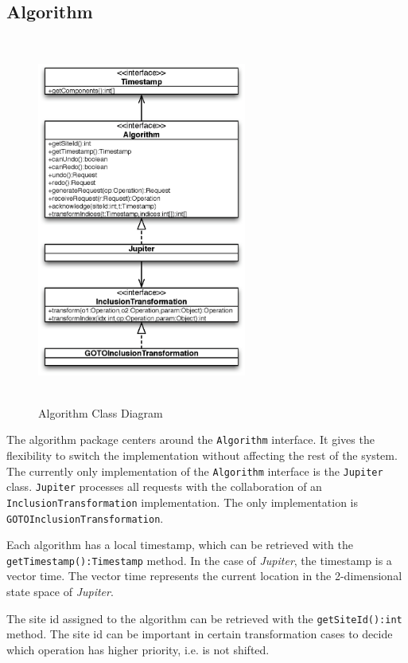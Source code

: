 \subsection{Algorithm}

\begin{figure}[H]
\centering
\includegraphics[height=12.09cm,width=6.87cm]{../images/finalreport/algorithm.eps}
\caption{Algorithm Class Diagram}
\label{fig:algorithm.uml}
\end{figure}

The algorithm package centers around the \texttt{Algorithm} interface.
It gives the flexibility to switch the implementation without affecting the 
rest of the system. The currently only implementation of the \texttt{Algorithm} 
interface is the \texttt{Jupiter} class. \texttt{Jupiter} processes 
all requests with the collaboration of an \texttt{InclusionTransformation}
implementation. The only implementation is \texttt{GOTOInclusionTransformation}.

Each algorithm has a local timestamp, which can be retrieved with the
\texttt{getTimestamp():Timestamp} method. In the 
case of \emph{Jupiter}, the timestamp is a vector time. The vector 
time represents the current location in the 2-dimensional state space of 
\emph{Jupiter}. 

The site id assigned to the algorithm can be retrieved with the
\texttt{getSiteId():int} method. The site id can be important in certain
transformation cases to decide which operation has higher priority, i.e.
is not shifted.

